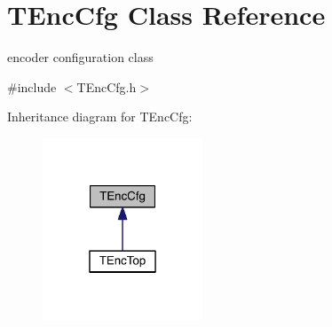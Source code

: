 \hypertarget{class_t_enc_cfg}{}\section{T\+Enc\+Cfg Class Reference}
\label{class_t_enc_cfg}


encoder configuration class  




{\ttfamily \#include $<$T\+Enc\+Cfg.\+h$>$}



Inheritance diagram for T\+Enc\+Cfg\+:
\nopagebreak
\begin{figure}[H]
\begin{center}
\leavevmode
\includegraphics[width=135pt]{db/d74/class_t_enc_cfg__inherit__graph}
\end{center}
\end{figure}


